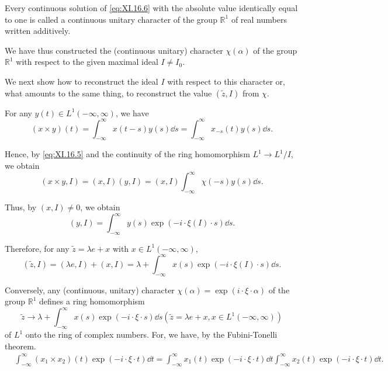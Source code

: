 Every continuous solution of \eqref{eq:XI.16.6} with the absolute value identically equal to one is called a continuous unitary character of the group $\mathbb{R}^{1}$ of real numbers written additively. 

We have thus constructed the (continuous unitary) character $\chi(\alpha)$ of the group $\mathbb{R}^{1}$ with respect to the given maximal ideal $I \neq I_{0}$. 

We next show how to reconstruct the ideal $I$ with respect to this character or, what amounts to the same thing, to reconstruct the value $(\tilde{z}, I)$ from $\chi$. 

For any $y(t) \in L^{1}(-\infty, \infty)$, we have 
\[
(x \times y) (t) = \int_{- \infty} ^{\infty} x (t - s) y (s) \dd s = \int_{- \infty} ^{\infty} x _{-s} (t) y (s) \dd s.
\]

Hence, by \eqref{eq:XI.16.5} and the continuity of the ring homomorphism $L^1 \to L^1 / I$, we obtain 
\[
(x \times y, I) = (x, I) (y, I) = (x, I) \int_{- \infty} ^{\infty} \chi (- s) y (s) \dd s.
\]

Thus, by $(x, I) \neq 0$, we obtain 
\begin{equation}\label{eq:XI.16.8}
(y, I) = \int_{- \infty} ^{\infty} y (s) \exp (- i \cdot \xi (I) \cdot s) \dd s.
\end{equation}

Therefore, for any $\tilde{z} = \lambda e + x$ with $x \in L^{1}(-\infty, \infty)$, 
\begin{equation}\label{eq:XI.16.9}
(\tilde {z}, I) = (\lambda e, I) + (x, I) = \lambda + \int_{- \infty} ^{\infty} x (s) \exp (- i \cdot \xi (I) \cdot s) \dd s.
\end{equation}

Conversely, any (continuous, unitary) character $\chi(\alpha) = \exp(i \cdot \xi \cdot \alpha)$ of the group $\mathbb{R}^{1}$ defines a ring homomorphism 
\begin{equation}\label{eq:XI.16.10}
\tilde {z} \rightarrow \lambda + \int_{- \infty} ^{\infty} x (s) \exp (- i \cdot \xi \cdot s) \dd s (\tilde {z} = \lambda e + x, x \in L ^{1} (- \infty , \infty))
\end{equation}
of $L^{1}$ onto the ring of complex numbers. For, we have, by the Fubini-Tonelli theorem. 
\begin{equation}\label{eq:XI.16.11}
\begin{aligned}
&\int_{- \infty} ^{\infty} (x _{1} \times x _{2}) (t) \exp (- i \cdot \xi \cdot t) \dd t = \int_{- \infty} ^{\infty} x _{1} (t) \exp (- i \cdot \xi \cdot t) \dd t \int_{- \infty} ^{\infty} x _{2} (t) \exp (- i \cdot \xi \cdot t) \dd t.
\end{aligned}
\end{equation}

